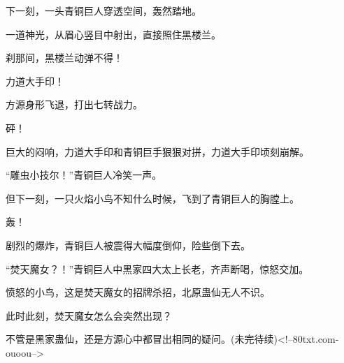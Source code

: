 \begin{this_body}
下一刻，一头青铜巨人穿透空间，轰然踏地。

一道神光，从眉心竖目中射出，直接照住黑楼兰。

刹那间，黑楼兰动弹不得！

力道大手印！

方源身形飞退，打出七转战力。

砰！

巨大的闷响，力道大手印和青铜巨手狠狠对拼，力道大手印顷刻崩解。

“雕虫小技尔！”青铜巨人冷笑一声。

但下一刻，一只火焰小鸟不知什么时候，飞到了青铜巨人的胸膛上。

轰！

剧烈的爆炸，青铜巨人被震得大幅度倒仰，险些倒下去。

“焚天魔女？！”青铜巨人中黑家四大太上长老，齐声断喝，惊怒交加。

愤怒的小鸟，这是焚天魔女的招牌杀招，北原蛊仙无人不识。

此时此刻，焚天魔女怎么会突然出现？

不管是黑家蛊仙，还是方源心中都冒出相同的疑问。(未完待续)<!--80txt.com-ouoou-->

\end{this_body}

